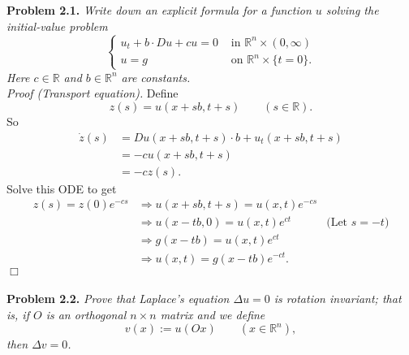 \documentclass{article}
\begin{document}
\textbf{Problem 2.1.}
\emph{Write down an explicit formula for a function $u$ solving
the initial-value problem
\begin{equation*}
  \begin{cases}
    u_t + b \cdot Du + cu = 0 & \text{ in } \mathbb{R}^n \times (0,\infty) \\
    u                     = g & \text{ on } \mathbb{R}^n \times \{ t=0 \}.
  \end{cases}
\end{equation*}
Here $c \in \mathbb{R}$ and $b \in \mathbb{R}^n$ are constants.} \\

\emph{Proof (Transport equation).}
Define
\[
  z(s) = u(x+sb,t+s) \qquad (s \in \mathbb{R}).
\]
So
\begin{align*}
  \dot{z}(s)
  &= Du(x+sb,t+s) \cdot b + u_t(x+sb,t+s) \\
  &= -cu(x+sb,t+s) \\
  &= -cz(s).
\end{align*}
Solve this ODE to get
\begin{align*}
  z(s) = z(0) e^{-cs}
  &\Longrightarrow
  u(x+sb,t+s) = u(x,t) e^{-cs} \\
  &\Longrightarrow
  u(x-tb,0) = u(x,t) e^{ct}
    &\text{(Let $s = -t$)} \\
  &\Longrightarrow
  g(x-tb) = u(x,t) e^{ct} \\
  &\Longrightarrow
  u(x,t) = g(x-tb) e^{-ct}.
\end{align*}
$\Box$ \\\\






\textbf{Problem 2.2.}
\emph{Prove that Laplace's equation $\Delta u = 0$ is rotation invariant;
that is, if $O$ is an orthogonal $n \times n$ matrix and we define
\[
  v(x) := u(Ox) \qquad (x \in \mathbb{R}^n),
\]
then $\Delta v = 0$.} \\
\end{document}
